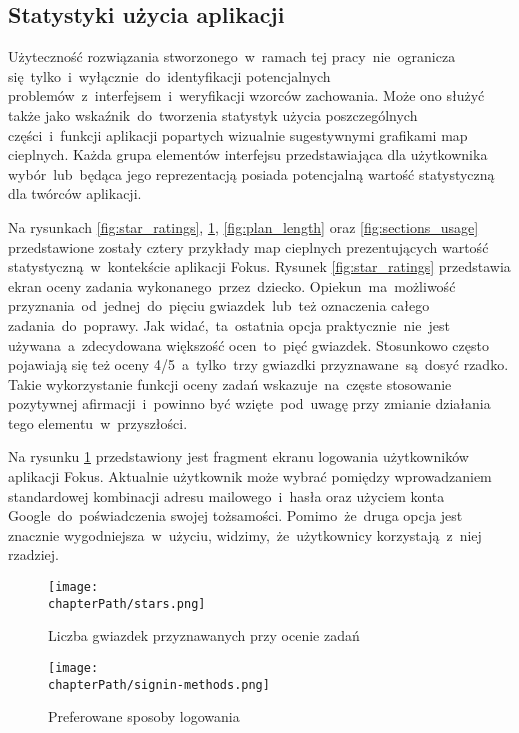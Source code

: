 \subsection{Statystyki użycia aplikacji}
Użyteczność rozwiązania stworzonego~w~ramach tej pracy~nie~ogranicza się~tylko~i~wyłącznie~do~identyfikacji potencjalnych problemów~z~interfejsem~i~weryfikacji wzorców zachowania. Może ono służyć także jako wskaźnik~do~tworzenia statystyk użycia poszczególnych części~i~funkcji aplikacji popartych wizualnie sugestywnymi grafikami map cieplnych. Każda grupa elementów interfejsu przedstawiająca dla użytkownika wybór~lub~będąca jego reprezentacją posiada potencjalną wartość statystyczną dla twórców aplikacji.

Na rysunkach \ref{fig:star_ratings}, \ref{fig:signin_methods}, \ref{fig:plan_length} oraz \ref{fig:sections_usage} przedstawione zostały cztery przykłady map cieplnych prezentujących wartość statystyczną~w~kontekście aplikacji Fokus. Rysunek \ref{fig:star_ratings} przedstawia ekran oceny zadania wykonanego~przez~dziecko. Opiekun~ma~możliwość przyznania~od~jednej~do~pięciu gwiazdek~lub~też oznaczenia całego zadania~do~poprawy. Jak widać,~ta~ostatnia opcja praktycznie~nie~jest używana~a~zdecydowana większość ocen~to~pięć gwiazdek. Stosunkowo często pojawiają się też oceny 4/5~a~tylko~trzy gwiazdki przyznawane~są~dosyć rzadko. Takie wykorzystanie funkcji oceny zadań wskazuje~na~częste stosowanie pozytywnej afirmacji~i~powinno być wzięte~pod~uwagę przy zmianie działania tego elementu~w~przyszłości.

Na rysunku \ref{fig:signin_methods} przedstawiony jest fragment ekranu logowania użytkowników aplikacji Fokus. Aktualnie użytkownik może wybrać pomiędzy wprowadzaniem standardowej kombinacji adresu mailowego~i~hasła oraz użyciem konta Google~do~poświadczenia swojej tożsamości. Pomimo~że~druga opcja jest znacznie wygodniejsza~w~użyciu, widzimy,~że~użytkownicy korzystają~z~niej rzadziej.

\bigskip
\begin{figure}[H]
\centering
\begin{minipage}{.45\textwidth}
	\centering
	\texttt{[image: \\chapterPath/stars.png]}
	\bigskip
	\caption{Liczba gwiazdek przyznawanych przy ocenie zadań}
	\label{fig:star_ratings}
\end{minipage}
\begin{minipage}{.45\textwidth}
	\centering
	\texttt{[image: \\chapterPath/signin-methods.png]}
	\bigskip
	\caption{Preferowane sposoby logowania}
	\label{fig:signin_methods}
\end{minipage}
\end{figure}

